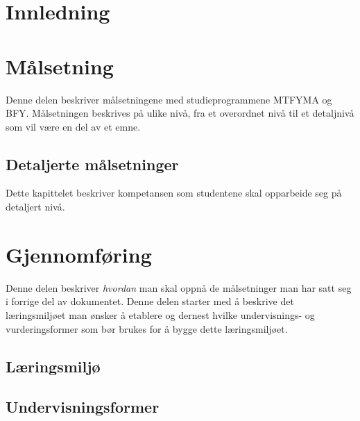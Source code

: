 \documentclass[a4paper, oneside, 12pt]{memoir}
\begin{document}
\frontmatter
\tableofcontents

\part{Innledning}

\mainmatter



\part{Målsetning}

Denne delen beskriver målsetningene med studieprogrammene MTFYMA og BFY. Målsetningen beskrives på ulike nivå, fra et overordnet nivå til et detaljnivå som vil være en del av et emne.



\chapter{Detaljerte målsetninger}
Dette kapittelet beskriver kompetansen som studentene skal opparbeide seg på detaljert nivå.


\part{Gjennomføring}

Denne delen beskriver \emph{hvordan} man skal oppnå de målsetninger man har satt seg i forrige del av dokumentet. Denne delen starter med å beskrive det læringsmiljøet man ønsker å etablere og dernest hvilke undervisnings- og vurderingsformer som bør brukes for å bygge dette læringsmiljøet.

	\chapter{Læringsmiljø}
	
	\chapter{Undervisningsformer}
	
\end{document}
